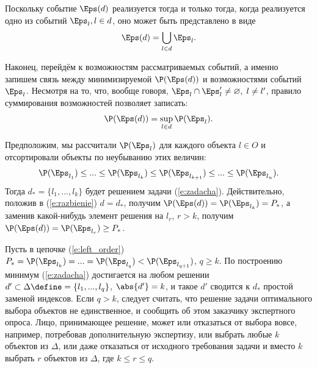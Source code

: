 Поскольку событие $\Eps(d)$ реализуется тогда и только тогда, когда реализуется одно из событий $\Eps_l, l \in d$, оно может быть представлено в виде
\begin{equation*}
  \Eps(d) = \bigcup_{l \in d} \Eps_l.
\end{equation*}

Наконец, перейдём к возможностям рассматриваемых событий, а именно запишем связь между минимизируемой $\P(\Eps(d))$ и возможностями событий $\Eps_l$. Несмотря на то, что, вообще говоря, $\Eps_l \cap \Eps_l' \neq \varnothing,\; l \neq l'$, правило суммирования возможностей позволяет записать:
\begin{equation}
  \label{e:razbienie}
  \P(\Eps(d)) = \sup_{l \in d} \P(\Eps_l).
\end{equation}

Предположим, мы рассчитали  $\P(\Eps_l)$ для каждого объекта $l \in O$ и отсортировали объекты по неубыванию этих величин:
\begin{equation}
  \label{e:left_order}
  \P(\Eps_{l_1}) \leq ... \leq \P(\Eps_{l_k}) \leq \P(\Eps_{l_{k+1}}) \leq ... \leq \P(\Eps_{l_n}). 
\end{equation}
Тогда $d_* = \{l_1, ...,  l_k\}$ будет решением задачи (\ref{e:zadacha}). Действительно, положив в (\ref{e:razbienie}) $d = d_*$, получим $\P(\Eps(d)) = \P(\Eps_{l_k}) = P_*$, а заменив какой-нибудь элемент  решения на $l_r$, $r > k$, получим $\P(\Eps(d)) = \P(\Eps_{l_r}) \geq P_*$. 

\noticeheader
\begin{notice}
Пусть в цепочке (\ref{e:left_order}) $P_* = \P(\Eps_{l_k}) = ... = \P(\Eps_{l_q}) < \P(\Eps_{l_{q+1}})$, $q \geq k$. По построению минимум (\ref{e:zadacha}) достигается на любом решении $d' \subset \Delta \define= \{l_1, ..., l_q\}$, $\abs{d'} = k$, и такое $d'$ сводится к $d_*$ простой заменой индексов. Если $q > k$, следует считать, что решение задачи оптимального выбора объектов не единственное, и сообщить об этом заказчику экспертного опроса. Лицо, принимающее решение, может или отказаться от выбора вовсе, например, потребовав дополнительную экспертизу, или выбрать любые $k$ объектов из $\Delta$, или даже отказаться от исходного требования задачи и вместо $k$ выбрать $r$ объектов из $\Delta$, где $k \leq r \leq q$.
\end{notice}

